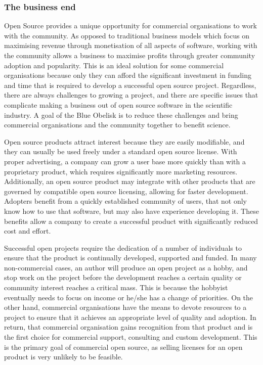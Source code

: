 \documentclass[10pt]{bmc_article}
\newenvironment{bmcformat}{\fussy\setboolean{publ}{true}}{\fussy}
\begin{document}
\begin{bmcformat}
\subsubsection*{The business end}


Open Source provides a unique opportunity for commercial organisations to work with the community. As opposed to traditional business models which focus on maximising revenue through monetisation of all aspects of software, working with the community allows a business to maximise profits through greater community adoption and popularity. This is an ideal solution for some commercial organisations because only they can afford the significant investment in funding and time that is required to develop a successful open source project. Regardless, there are always challenges to growing a project, and there are specific issues that complicate making a business out of open source software in the scientific industry. A goal of the Blue Obelisk is to reduce these challenges and bring commercial organisations and the community together to benefit science.

Open source products attract interest because they are easily modifiable, and they can usually be used freely under a standard open source license. With proper advertising, a company can grow a user base more quickly than with a proprietary product, which requires significantly more marketing resources. Additionally, an open source product may integrate with other products that are governed by compatible open source licensing, allowing for faster development. Adopters benefit from a quickly established community of users, that not only know how to use that software, but may also have experience developing it. These benefits allow a company to create a successful product with significantly reduced cost and effort.

Successful open projects require the dedication of a number of individuals to ensure that the product is continually developed, supported and funded. In many non-commercial cases, an author will produce an open project as a hobby, and stop work on the project before the development reaches a certain quality or community interest reaches a critical mass. This is because the hobbyist eventually needs to focus on income or he/she has a change of priorities. On the other hand, commercial organisations have the means to devote resources to a project to ensure that it achieves an appropriate level of quality and adoption. In return, that commercial organisation gains recognition from that product and is the first choice for commercial support, consulting and custom development. This is the primary goal of commercial open source, as selling licenses for an open product is very unlikely to be feasible.


\end{bmcformat}
\end{document}
